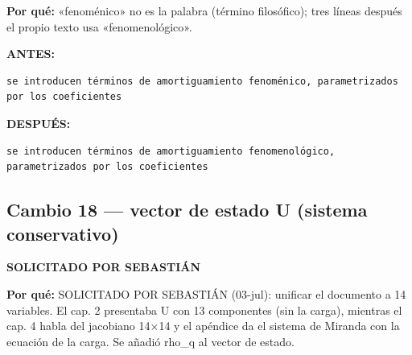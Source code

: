 \documentclass[11pt,a4paper]{article}
\begin{document}
\textbf{Por qué:} «fenoménico» no es la palabra (término filosófico); tres líneas después el propio texto usa «fenomenológico».

\textcolor{antesline}{\textbf{ANTES:}}
\begin{Verbatim}[breaklines=true, breakanywhere=true, fontsize=\small, frame=leftline, rulecolor=\color{antesline}, framerule=1.2pt]
se introducen términos de amortiguamiento fenoménico, parametrizados por los coeficientes
\end{Verbatim}
\textcolor{despline}{\textbf{DESPUÉS:}}
\begin{Verbatim}[breaklines=true, breakanywhere=true, fontsize=\small, frame=leftline, rulecolor=\color{despline}, framerule=1.2pt]
se introducen términos de amortiguamiento fenomenológico, parametrizados por los coeficientes
\end{Verbatim}

\subsection*{Cambio 18 --- vector de estado U (sistema conservativo)}
\colorbox{usrbg}{\textbf{\footnotesize SOLICITADO POR SEBASTIÁN}}

\textbf{Por qué:} SOLICITADO POR SEBASTIÁN (03-jul): unificar el documento a 14 variables. El cap. 2 presentaba U con 13 componentes (sin la carga), mientras el cap. 4 habla del jacobiano 14×14 y el apéndice da el sistema de Miranda con la ecuación de la carga. Se añadió rho\_q al vector de estado.
\end{document}
